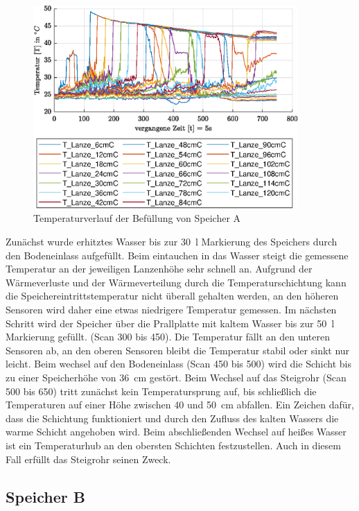 \begin{figure}[H]
	\centering
	\includegraphics[width=0.9\textwidth]{../DATA/SpA_Lanzen.eps}
	\caption[Temperaturverlauf Speicher A]{Temperaturverlauf der Befüllung von Speicher A}
	\label{fig:SpAfill}
\end{figure}

Zunächst wurde erhitztes Wasser bis zur \SI{30}{\litre} Markierung des Speichers durch den Bodeneinlass aufgefüllt. Beim eintauchen in das Wasser steigt die gemessene Temperatur an der jeweiligen Lanzenhöhe sehr schnell an. Aufgrund der Wärmeverluste und der Wärmeverteilung durch die Temperaturschichtung kann die Speichereintrittstemperatur nicht überall gehalten werden, an den höheren Sensoren wird daher eine etwas niedrigere Temperatur gemessen. Im nächsten Schritt wird der Speicher über die Prallplatte mit kaltem Wasser bis zur \SI{50}{\litre} Markierung gefüllt. (Scan 300 bis 450). Die Temperatur fällt an den unteren Sensoren ab, an den oberen Sensoren bleibt die Temperatur stabil oder sinkt nur leicht. Beim wechsel auf den Bodeneinlass (Scan 450 bis 500) wird die Schicht bis zu einer Speicherhöhe von \SI{36}{\centi\meter} gestört. Beim Wechsel auf das Steigrohr (Scan 500 bis 650) tritt zunächst kein Temperatursprung auf, bis schließlich die Temperaturen auf einer Höhe zwischen 40 und \SI{50}{\centi\meter} abfallen. Ein Zeichen dafür, dass die Schichtung funktioniert und durch den Zufluss des kalten Wassers die warme Schicht angehoben wird. Beim abschließenden Wechsel auf heißes Wasser ist ein Temperaturhub an den obersten Schichten festzustellen. Auch in diesem Fall erfüllt das Steigrohr seinen Zweck.

\subsection{Speicher B}
